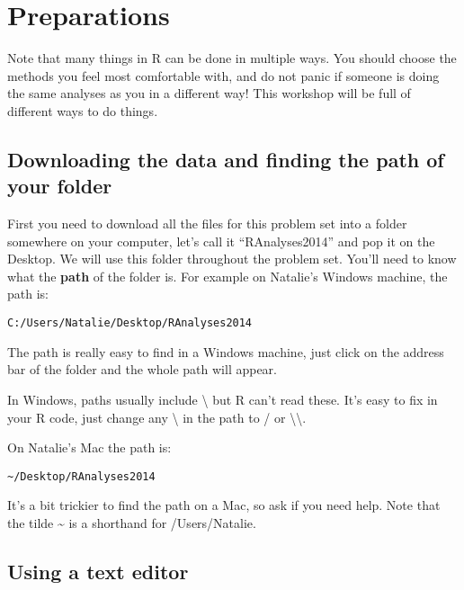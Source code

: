 \documentclass[11pt]{article}
\begin{document}
\newpage{}
\section{Preparations}

\begin{framed}
Note that many things in R can be done in multiple ways. You should
choose the methods you feel most comfortable with, and do not panic if
someone is doing the same analyses as you in a different way! This
workshop will be full of different ways to do things.
\end{framed}

\subsection{Downloading the data and finding the path of your folder}
\label{download}
First you need to download all the files for this problem set into a
folder somewhere on your computer, let's call it ``RAnalyses2014'' and
pop it on the Desktop. We will use this folder throughout the problem
set. You'll need to know what the \textbf{path} of the folder is. For
example on Natalie's Windows machine, the path is:

\begin{snugshade}
\texttt{C:/Users/Natalie/Desktop/RAnalyses2014}
\end{snugshade}

The path is really easy to find in a Windows machine, just click on the
address bar of the folder and the whole path will appear.

\begin{framed}
In Windows, paths usually include \textbackslash{} but R
can't read these. It's easy to fix in your R code, just change any \textbackslash{} in
the path to / or \textbackslash{}\textbackslash{}.
\end{framed}

On Natalie's Mac the path is:

\begin{snugshade}
\texttt{\textasciitilde{}/Desktop/RAnalyses2014}
\end{snugshade}

It's a bit trickier to find the path on a Mac, so ask if you need help. 
Note that the tilde \textasciitilde{} is a shorthand for /Users/Natalie. 

\subsection{Using a text editor}
\end{document}
